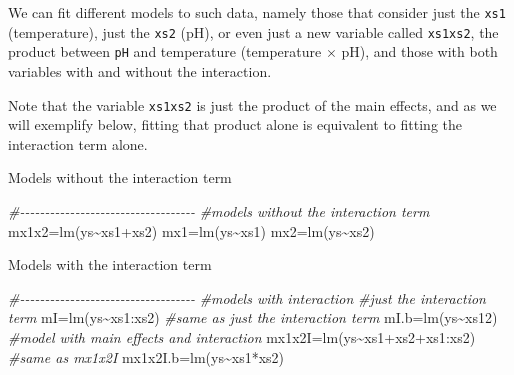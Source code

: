 \documentclass[
]{book}
\newenvironment{Shaded}{\begin{snugshade}}{\end{snugshade}}
\newcommand{\CommentTok}[1]{\textcolor[rgb]{0.56,0.35,0.01}{\textit{#1}}}
\newcommand{\FunctionTok}[1]{\textcolor[rgb]{0.00,0.00,0.00}{#1}}
\newcommand{\NormalTok}[1]{#1}
\newcommand{\OtherTok}[1]{\textcolor[rgb]{0.56,0.35,0.01}{#1}}
\newcommand{\SpecialCharTok}[1]{\textcolor[rgb]{0.00,0.00,0.00}{#1}}
\begin{document}
We can fit different models to such data, namely those that consider just the \texttt{xs1} (temperature), just the \texttt{xs2} (pH), or even just a new variable called \texttt{xs1xs2}, the product between \texttt{pH} and temperature (temperature \(\times\) pH), and those with both variables with and without the interaction.

Note that the variable \texttt{xs1xs2} is just the product of the main effects, and as we will exemplify below, fitting that product alone is equivalent to fitting the interaction term alone.

Models without the interaction term

\begin{Shaded}
\begin{Highlighting}[]
\CommentTok{\#{-}{-}{-}{-}{-}{-}{-}{-}{-}{-}{-}{-}{-}{-}{-}{-}{-}{-}{-}{-}{-}{-}{-}{-}{-}{-}{-}{-}{-}{-}{-}{-}{-}{-}{-}}
\CommentTok{\#models without the interaction term}
\NormalTok{mx1x2}\OtherTok{=}\FunctionTok{lm}\NormalTok{(ys}\SpecialCharTok{\textasciitilde{}}\NormalTok{xs1}\SpecialCharTok{+}\NormalTok{xs2)}
\NormalTok{mx1}\OtherTok{=}\FunctionTok{lm}\NormalTok{(ys}\SpecialCharTok{\textasciitilde{}}\NormalTok{xs1)}
\NormalTok{mx2}\OtherTok{=}\FunctionTok{lm}\NormalTok{(ys}\SpecialCharTok{\textasciitilde{}}\NormalTok{xs2)}
\end{Highlighting}
\end{Shaded}

Models with the interaction term

\begin{Shaded}
\begin{Highlighting}[]
\CommentTok{\#{-}{-}{-}{-}{-}{-}{-}{-}{-}{-}{-}{-}{-}{-}{-}{-}{-}{-}{-}{-}{-}{-}{-}{-}{-}{-}{-}{-}{-}{-}{-}{-}{-}{-}{-}}
\CommentTok{\#models with interaction}
\CommentTok{\#just the interaction term}
\NormalTok{mI}\OtherTok{=}\FunctionTok{lm}\NormalTok{(ys}\SpecialCharTok{\textasciitilde{}}\NormalTok{xs1}\SpecialCharTok{:}\NormalTok{xs2)}
\CommentTok{\#same as just the interaction term}
\NormalTok{mI.b}\OtherTok{=}\FunctionTok{lm}\NormalTok{(ys}\SpecialCharTok{\textasciitilde{}}\NormalTok{xs12)}
\CommentTok{\#model with main effects and interaction}
\NormalTok{mx1x2I}\OtherTok{=}\FunctionTok{lm}\NormalTok{(ys}\SpecialCharTok{\textasciitilde{}}\NormalTok{xs1}\SpecialCharTok{+}\NormalTok{xs2}\SpecialCharTok{+}\NormalTok{xs1}\SpecialCharTok{:}\NormalTok{xs2)}
\CommentTok{\#same as mx1x2I}
\NormalTok{mx1x2I.b}\OtherTok{=}\FunctionTok{lm}\NormalTok{(ys}\SpecialCharTok{\textasciitilde{}}\NormalTok{xs1}\SpecialCharTok{*}\NormalTok{xs2)}
\end{Highlighting}
\end{Shaded}
\end{document}
